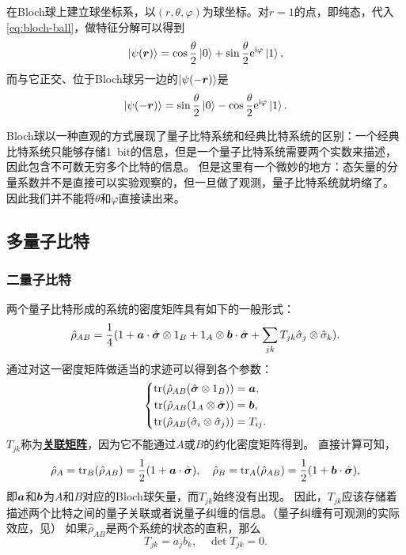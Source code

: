 \documentclass[hyperref, UTF8, a4paper]{ctexart}
\newcommand*{\ii}{\mathrm{i}}
\newcommand*{\ee}{\mathrm{e}}
\renewcommand{\autoref}{\prettyref}
\newcommand*{\concept}[1]{\underline{\textbf{#1}}}
\begin{document}
在Bloch球上建立球坐标系，以$(r, \theta, \varphi)$为球坐标。对$r=1$的点，即纯态，代入\eqref{eq:bloch-ball}，做特征分解可以得到
\begin{equation}
    \ket{\psi(\vb*{r})} = \cos \frac{\theta}{2} \ket{0} + \sin \frac{\theta}{2} \ee^{\ii \varphi} \ket{1},
    \label{eq:state-on-ball}
\end{equation}
而与它正交、位于Bloch球另一边的$\ket{\psi(-\vb*{r})}$是
\begin{equation}
    \ket{\psi(-\vb*{r})} = \sin \frac{\theta}{2} \ket{0} - \cos \frac{\theta}{2} \ee^{\ii \varphi} \ket{1}.
\end{equation}

Bloch球以一种直观的方式展现了量子比特系统和经典比特系统的区别：一个经典比特系统只能够存储\SI{1}{bit}的信息，但是一个量子比特系统需要两个实数来描述，因此包含不可数无穷多个比特的信息。
但是这里有一个微妙的地方：态矢量的分量系数并不是直接可以实验观察的，但一旦做了观测，量子比特系统就坍缩了。
因此我们并不能将$\theta$和$\varphi$直接读出来。

\subsection{多量子比特}

\subsubsection{二量子比特}

两个量子比特形成的系统的密度矩阵具有如下的一般形式：
\begin{equation}
    \hat{\rho}_{AB} = \frac{1}{4} (1 + \vb*{a} \cdot \hat{\vb*{\sigma}} \otimes 1_B + 1_A \otimes \vb*{b} \cdot \hat{\vb*{\sigma}} + \sum_{jk} T_{jk} \hat{\sigma}_j \otimes \hat{\sigma}_k ).
\end{equation}
通过对这一密度矩阵做适当的求迹可以得到各个参数：
\begin{equation}
    \left\{
        \begin{aligned}
            \trace (\hat{\rho}_{AB} (\hat{\vb*{\sigma}} \otimes 1_B)) &= \vb*{a}, \\
            \trace (\hat{\rho}_{AB} (1_A \otimes \hat{\vb*{\sigma}})) &= \vb*{b}, \\
            \trace (\hat{\rho}_{AB} (\hat{\sigma}_i \otimes \hat{\sigma}_j) ) &= T_{ij}.
        \end{aligned}
    \right.
\end{equation}
$T_{jk}$称为\concept{关联矩阵}，因为它不能通过$A$或$B$的约化密度矩阵得到。
直接计算可知，
\begin{equation}
    \hat{\rho}_A = \trace_B (\hat{\rho}_{AB}) = \frac{1}{2} (1 + \vb*{a} \cdot \hat{\vb*{\sigma}}), \quad \hat{\rho}_B = \trace_A (\hat{\rho}_{AB}) = \frac{1}{2} (1 + \vb*{b} \cdot \hat{\vb*{\sigma}}),
\end{equation}
即$\vb*{a}$和$\vb*{b}$为$A$和$B$对应的Bloch球矢量，而$T_{jk}$始终没有出现。
因此，$T_{jk}$应该存储着描述两个比特之间的量子关联或者说量子纠缠的信息。（量子纠缠有可观测的实际效应，见\autoref{sec:correlation}）
如果$\hat{\rho}_{AB}$是两个系统的状态的直积，那么
\[
    T_{jk} = a_j b_k, \quad \det T_{jk} = 0.
\]
\end{document}
